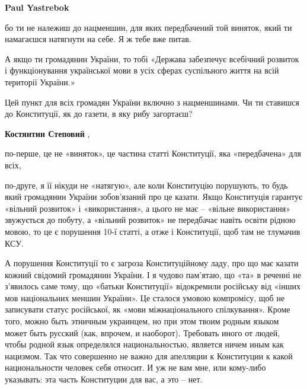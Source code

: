 \begin{itemize}
\begin{itemize}
 
\textbf{Paul Yastrebok} 

бо ти не належиш до нацменшин, для яких передбачений той виняток, який ти
намагаєшся натягнути на себе. Я ж тебе вже питав.

А якщо ти громадянин України, то тобі «Держава забезпечує всебічний розвиток і
функціонування української мови в усіх сферах суспільного життя на всій
території України.»

Цей пункт для всіх громадян України включно з нацменшинами. Чи ти ставишся до
Конституції, як до газети, в яку рибу загортаєш?

 
\textbf{Костянтин Степовий} , 

по-перше, це не «виняток», це частина статті Конституції, яка «передбачена» для
всіх, 

по-друге, я її нікуди не «натягую», але коли Конституцію порушують, то будь
який громадянин України зобов’язаний про це казати. Якщо Конституція гарантує
«вільний розвиток» і «використання», а цього не має – «вільне використання»
звужується до побуту, а «вільний розвиток» не передбачає навіть освіти рідною
мовою, то це є порушення 10-ї статті, а отже і Конституції, щоб там не тлумачив
КСУ. 

А порушення Конституції то є загроза Конституційному ладу, про що має казати
кожний свідомий громадянин України. І я чудово пам’ятаю, що «та» в реченні не
з’явилось саме тому, що «батьки Конституції» відокремили російську від «інших
мов національних меншин України».  Це сталося умовою компромісу, щоб не
записувати статус російської, як «мови міжнаціонального спілкування». Кроме
того, можно быть этничным украинцем, но при этом твоим родным языком может быть
русский (как, впрочем, и наоборот).  Требовать иного от людей, чтобы родной
язык определялся национальностью, является ничем иным как нацизмом. Так что
совершенно не важно для апелляции к Конституции к какой национальности человек
себя относит. И уж не вам мне, или кому-либо указывать: эта часть Конституции
для вас, а это – нет. 


\end{itemize}
\end{itemize}
